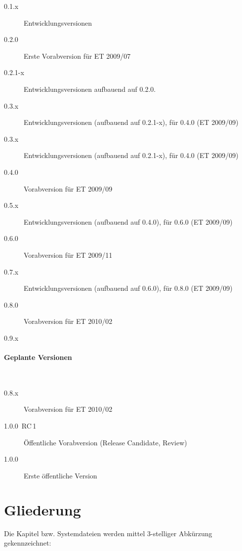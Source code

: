 \documentclass[ngerman,paper=a4,fontsize=8pt,headings=small,draft=no,parskip=half,noonelinecaption]{scrreprt}
\begin{document}
\begin{description}
    \item[0.1.x] Entwicklungsversionen
    \item[0.2.0] Erste Vorabversion für ET 2009/07
    \item[0.2.1-x] Entwicklungsversionen aufbauend auf
    0.2.0.
    \item[0.3.x] Entwicklungsversionen (aufbauend auf
    0.2.1-x), für 0.4.0 (ET 2009/09)
    \item[0.3.x] Entwicklungsversionen (aufbauend auf
    0.2.1-x), für 0.4.0 (ET 2009/09)
    \item[0.4.0] Vorabversion für ET 2009/09
    \item[0.5.x] Entwicklungsversionen (aufbauend auf
    0.4.0), für 0.6.0 (ET 2009/09)
    \item[0.6.0] Vorabversion für ET 2009/11
    \item[0.7.x] Entwicklungsversionen (aufbauend auf
    0.6.0), für 0.8.0 (ET 2009/09)
    \item[0.8.0] Vorabversion für ET 2010/02
    \item[0.9.x]
\end{description}


\paragraph{Geplante Versionen}~

\begin{description}

    \item[0.8.x] Vorabversion für ET 2010/02
    \item[1.0.0~RC\,1] Öffentliche Vorabversion (Release
    Candidate, Review)
    \item[1.0.0] Erste öffentliche Version
\end{description}

\section{Gliederung}
Die Kapitel bzw. Systemdateien werden mittel 3-stelliger
Abkürzung gekennzeichnet:
\end{document}
